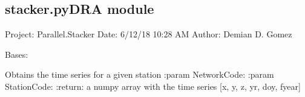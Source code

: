 \documentclass[letterpaper,10pt,english]{sphinxmanual}
\begin{document}
\subsection{stacker.pyDRA module}
\label{\detokenize{stacker:module-stacker.pyDRA}}\label{\detokenize{stacker:stacker-pydra-module}}
\sphinxAtStartPar
Project: Parallel.Stacker
Date: 6/12/18 10:28 AM
Author: Demian D. Gomez

\begin{fulllineitems}
\label{\detokenize{stacker:stacker.pyDRA.DRA}}
\pysigstartsignatures
{}
\pysigstopsignatures
\sphinxAtStartPar
Bases: 

\begin{fulllineitems}
\label{\detokenize{stacker:stacker.pyDRA.DRA.get_station}}
\pysigstartsignatures
{}
\pysigstopsignatures
\sphinxAtStartPar
Obtains the time series for a given station
:param NetworkCode:
:param StationCode:
:return: a numpy array with the time series {[}x, y, z, yr, doy, fyear{]}

\end{fulllineitems}


\begin{fulllineitems}
\label{\detokenize{stacker:stacker.pyDRA.DRA.stack_dra}}
\pysigstartsignatures
{}
\pysigstopsignatures
\end{fulllineitems}


\begin{fulllineitems}
\label{\detokenize{stacker:stacker.pyDRA.DRA.to_json}}
\pysigstartsignatures
{}
\pysigstopsignatures
\end{fulllineitems}


\end{fulllineitems}
\end{document}
